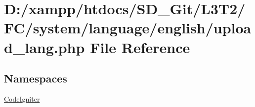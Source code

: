 \hypertarget{upload__lang_8php}{}\section{D\+:/xampp/htdocs/\+S\+D\+\_\+\+Git/\+L3\+T2/\+F\+C/system/language/english/upload\+\_\+lang.php File Reference}
\label{upload__lang_8php}
\subsection*{Namespaces}
\begin{DoxyCompactItemize}
\item 
 \hyperlink{namespace_code_igniter}{Code\+Igniter}
\end{DoxyCompactItemize}
